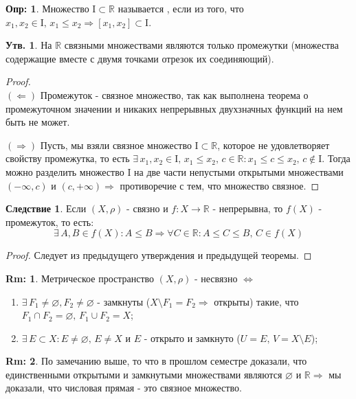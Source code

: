 \documentclass[12pt]{article}
\newcommand{\MR}{\mathbb{R}}
\newcommand{\MI}{\mathrm{I}}
\newcommand{\VN}{\varnothing}
\theoremstyle{definition}
\newtheorem{defn}{Опр:}
\newtheorem{rem}{Rm:}
\newtheorem{prop}{Утв.}
\newtheorem{corollary}{Следствие}
\begin{document}
\begin{defn}
	Множество $\MI \subset \MR$ называется , если из того, что $x_1, x_2 \in \MI, \, x_1 \leq x_2 \Rightarrow [x_1,x_2] \subset \MI$.
\end{defn}
\begin{prop}
	На $\MR$ связными множествами являются только промежутки (множества содержащие вместе с двумя точками отрезок их соединяющий).
\end{prop}
\begin{proof}\hfill\\
	$(\Leftarrow)$ Промежуток - связное множество, так как выполнена теорема о промежуточном значении и никаких непрерывных двухзначных функций на нем быть не может. 
	
	$(\Rightarrow)$ Пусть, мы взяли связное множество $\MI \subset \MR$, которое не удовлетворяет свойству промежутка, то есть $\exists \, x_1, x_2 \in \MI, \, x_1 \leq x_2,\, c \in \MR \colon x_1 \leq c \leq x_2, \, c \notin \MI$. Тогда можно разделить множество $\MI$ на две части непустыми открытыми множествами $(-\infty,c)$ и $(c,+\infty) \Rightarrow$ противоречие с тем, что множество связное.
\end{proof}
\begin{corollary}
	Если $(X,\rho)$ - связно и $f\colon X \to \MR$ - непрерывна, то $f(X)$ - промежуток, то есть: 
	$$
		\exists \, A, B \in f(X) \colon A \leq B \Rightarrow \forall C \in \MR \colon A \leq C \leq B, \, C \in f(X)
	$$
\end{corollary}
\begin{proof}
	Следует из предыдущего утверждения и предыдущей теоремы.
\end{proof}
\begin{rem}
	Метрическое пространство $(X,\rho)$ - несвязно $\Leftrightarrow$
	\begin{enumerate}[label ={(\arabic*)}]
		\item $\exists \, F_1\neq \VN,F_2\neq \VN$ - замкнуты ($X \setminus F_1 = F_2 \Rightarrow$ открыты) такие, что $F_1 \cap F_2 = \VN, \, F_1 \cup F_2 = X$;
		\item $\exists \, E \subset X \colon E \neq \VN, \, E \neq X$ и $E$ - открыто и замкнуто ($U = E, \, V = X \setminus E$);
	\end{enumerate}
\end{rem}
\begin{rem}
	По замечанию выше, то что в прошлом семестре доказали, что единственными открытыми и замкнутыми множествами являются $\VN$ и $\MR \Rightarrow$ мы доказали, что числовая прямая - это связное множество.
\end{rem}
\end{document}
